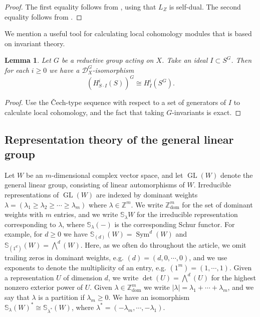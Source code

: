 \documentclass[11pt,reqno]{amsart}
\newcommand{\bw}{\bigwedge}
\newcommand{\D}{\mathcal{D}}
\newcommand{\bS}{\mathbb{S}}
\newcommand{\GL}{\operatorname{GL}}
\newcommand{\Sym}{\operatorname{Sym}}
\renewcommand{\det}{\operatorname{det}}
\newcommand{\dom}{\operatorname{dom}}
\newtheorem{lemma}[theorem]{Lemma}
\numberwithin{equation}{section}
\begin{document}

\begin{proof}
The first equality follows from \cite[Theorem 2.10.3]{achar}, using that $L_Z$ is self-dual. The second equality follows from  \cite[Proposition 5.1]{subexceptional}.
\end{proof}



We mention a useful tool for calculating local cohomology modules that is based on invariant theory.

\begin{lemma}\label{lem:locinv}
Let $G$ be a reductive group acting on $X$. Take an ideal $I\subset S^G$. Then for each $i\geq 0$ we have a $\D_X^G$-isomorphism
\[ \left(H^i_{S\cdot I}(S)\right)^G \cong H^i_I(S^G).\]
\end{lemma}

\begin{proof} Use the \v{C}ech-type sequence with respect to a set of generators of $I$ to calculate local cohomology, and the fact that taking $G$-invariants is exact.
\end{proof}

\subsection{Representation theory of the general linear group}\label{sec:reps} Let $W$ be an $m$-dimensional complex vector space, and let $\GL(W)$ denote the general linear group, consisting of linear automorphisms of $W$. Irreducible representations of $\GL(W)$ are indexed by dominant weights $\lambda=(\lambda_1\geq \lambda_{2}\geq \cdots \geq \lambda_m)$ where $\lambda\in \mathbb{Z}^m$. We write $\mathbb{Z}^m_{\dom}$ for the set of dominant weights with $m$ entries, and we write $\bS_{\lambda}W$ for the irreducible representation corresponding to $\lambda$, where $\bS_{\lambda}(-)$ is the corresponding Schur functor. For example, for $d\geq 0$ we have $\bS_{(d)}(W)=\Sym^d(W)$ and $\bS_{(1^d)}(W)=\bw^d(W)$. Here, as we often do throughout the article, we omit trailing zeros in dominant weights, e.g. $(d)=(d,0,\cdots,0)$, and we use exponents to denote the multiplicity of an entry, e.g. $(1^m)=(1,\cdots, 1)$. Given a representation $U$ of dimension $d$, we write $\det(U)=\bw^d(U)$ for the highest nonzero exterior power of $U$. Given $\lambda\in \mathbb{Z}^m_{\dom}$ we write $|\lambda|=\lambda_1+\cdots +\lambda_m$, and we say that $\lambda$ is a partition if $\lambda_m\geq 0$. We have an isomorphism $\bS_{\lambda}(W)^{\ast}\cong \bS_{\lambda^{\ast}}(W)$, where $\lambda^{\ast}=(-\lambda_m,\cdots, -\lambda_1)$.
\end{document}
